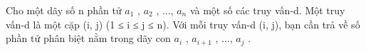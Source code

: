 Cho một dãy số n phần tử $a_{1}$   ,   $a_{2}$   , ..., $a_{n}$   và một số các truy vấn-d. Một truy vấn-d là một cặp (i, j) (1 ≤ i   ≤ j ≤ n). Với mỗi truy vấn-d (i, j), bạn cần trả về số phần   tử phân biệt nằm trong dãy con $a_{i}$   ,   $a_{i+1}$   , ..., $a_{j}$   .
